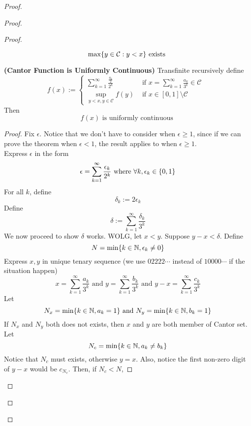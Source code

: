 \documentclass{report}
\begin{document}
\begin{proof}
\begin{proof}
\begin{proof}
\begin{lemma}
\begin{equation*}
  \max \{ y\in \mathcal{C}:y<x \}\text{ exists }
\end{equation*}
\end{lemma}
\begin{theorem}
\textbf{(Cantor Function is Uniformly Continuous)} Transfinite recursively define 
\begin{equation*}
f(x):=\begin{cases}
  \sum_{k=1}^\infty \frac{\frac{a_k}{2}}{2^{k}}& \text{ if $x=\sum_{k=1}^\infty \frac{a_k}{3^k}\in \mathcal{C}$ }\\
  \sup_{y<x,y \in \mathcal{C}} f(y)& \text{ if $x\in [0,1]\setminus \mathcal{C}$ }
\end{cases}
\end{equation*}
Then 
\begin{equation*}
f(x)\text{ is uniformly continuous }
\end{equation*}
\end{theorem}
\begin{proof}
Fix $\epsilon $. Notice that we don't have to consider when $\epsilon \geq 1$, since if we can prove the theorem when $\epsilon <1$, the result applies to when $\epsilon \geq 1$.\\

Express $\epsilon $ in the form
\begin{equation*}
\epsilon =\sum_{k=1}^\infty \frac{\epsilon _k}{2^k}\text{ where }\forall k,\epsilon _k\in \{ 0,1 \}
\end{equation*}
For all $k$, define 
\begin{equation*}
\delta_k:=2\epsilon _k
\end{equation*}
Define 
\begin{equation*}
\delta:=\sum_{k=1}^\infty \frac{\delta_k}{3^k}
\end{equation*}
We now proceed to show $\delta$ works. WOLG, let $x<y$. Suppose $y-x<\delta$. Define 
\begin{equation*}
N=\min  \{ k\in\mathbb{N}, \epsilon_k\neq 0 \}
\end{equation*}
Express $x,y$ in unique tenary sequence (we use $02222\cdots$ instead of  $10000\cdots$ if the situation happen)
 \begin{equation*}
x=\sum_{k=1}^\infty \frac{a_k}{3^k}\text{ and }y=\sum_{k=1}^\infty \frac{b_k}{3^k}\text{ and }y-x=\sum_{k=1}^\infty \frac{c_k}{3^k}
\end{equation*}
Let 
\begin{equation*}
N_x=\min \{ k\in\mathbb{N}, a_k=1 \}\text{ and }N_y=\min \{ k\in\mathbb{N},b_k=1 \}
\end{equation*}
If $N_x$ and  $N_y$ both does not exists, then $x$ and $y$ are both member of Cantor set. Let 
 \begin{equation*}
N_c=\min \{ k\in\mathbb{N}, a_k\neq b_k \}
\end{equation*}
Notice that $N_c$ must exists, otherwise $y=x$. Also, notice the first non-zero digit of  $y-x$ would be $c_{N_c}$. Then, if $N_c<N$, 





\end{proof}
\end{proof}
\end{proof}
\end{proof}
\end{document}

